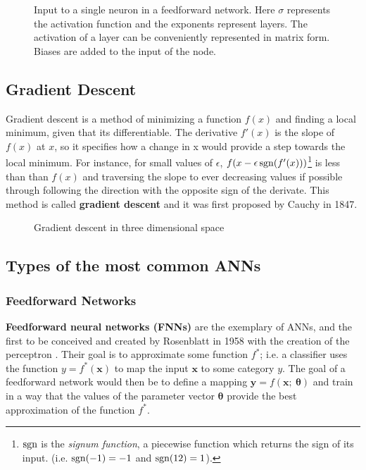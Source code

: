 \begin{figure}[h!]
  \centering
  \scalebox{1}{}
  \caption{Input to a single neuron in a feedforward network. Here $\sigma$ represents
    the activation function and the exponents represent layers. The activation of a layer
    can be conveniently represented in matrix form. Biases are added to the input of the
    node.}
  \label{fig:nn_activation}
\end{figure}



\subsection{Gradient Descent}\label{sec:gradient_descent}

Gradient descent is a method of minimizing a function $f(x)$ and
finding a local minimum, given that its differentiable. The
derivative $f'(x)$ is the slope of $f(x)$ at $x$, so it specifies
how a change in x would provide a step towards the local minimum. For instance,
for small values of $\epsilon$, $f(x - \epsilon \operatorname{sgn} (f'(x)))$\footnote{
  $\operatorname{sgn}$ is the \textit{signum function}, a piecewise function which returns
  the sign of its input. (i.e. $\operatorname{sgn}(-1) = -1$ and $\operatorname{sgn}(12) = 1$).
} is less than than $f(x)$ and traversing the slope to ever decreasing
values if possible through following the direction with the opposite
sign of the derivate. This method is called \textbf{gradient descent}
and it was first proposed by Cauchy \cite{article:Cauchy} in 1847.




\begin{figure}[h]
  \centering
  
  \caption{Gradient descent in three dimensional space}
  \label{fig:gradient_descent_2d}
\end{figure}

\subsection{Types of the most common ANNs}

\subsubsection{Feedforward Networks}

\textbf{Feedforward neural networks (FNNs)} are the exemplary of ANNs, and the first to be
conceived and created by Rosenblatt in 1958 with the creation of the
perceptron \cite{article:Rosenblatt1958ThePA}. Their goal is to approximate
some function $f^{*}$; i.e. a classifier uses the function
$y=f^{*}(\bm{x})$ to map the input $\bm{x}$ to some category $y$. The
goal of a feedforward network would then be to define a mapping
$\bm{y} = f(\bm{x};~\bm{\theta})$ and train in a way that the values
of the parameter vector $\bm{\theta}$ provide the best approximation of
the function $f^{*}$.

